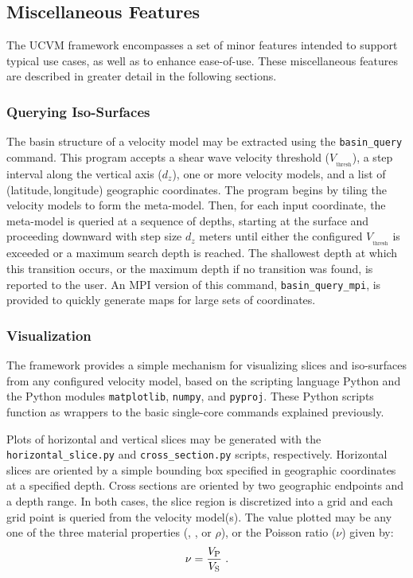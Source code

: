 
\subsection{Miscellaneous Features}

The UCVM framework encompasses a set of minor features intended to support typical use cases, as well as to enhance ease-of-use. These miscellaneous features are described in greater detail in the following sections.

\subsubsection{Querying \vs{} Iso-Surfaces}

The basin structure of a velocity model may be extracted using the \texttt{basin\_query} command. This program accepts a shear wave velocity threshold ($V_{_{\mathrm{thresh}}}$), a step interval along the vertical axis ($d_z$), one or more velocity models, and a list of (latitude,\,longitude) geographic coordinates. The program begins by tiling the velocity models to form the meta-model. Then, for each input coordinate, the meta-model is queried at a sequence of depths, starting at the surface and proceeding downward with step size $d_z$ meters until either the configured $V_{_{\mathrm{thresh}}}$ is exceeded or a maximum search depth is reached. The shallowest depth at which this transition occurs, or the maximum depth if no transition was found, is reported to the user. An MPI version of this command, \texttt{basin\_query\_mpi}, is provided to quickly generate maps for large sets of coordinates.

\subsubsection{Visualization}

The framework provides a simple mechanism for visualizing slices and iso-surfaces from any configured velocity model, based on the scripting language Python and the Python modules \texttt{matplotlib}, \texttt{numpy}, and \texttt{pyproj}. These Python scripts function as wrappers to the basic single-core commands explained previously.

Plots of horizontal and vertical slices may be generated with the \texttt{horizontal\_slice.py} and \texttt{cross\_section.py} scripts, respectively. Horizontal slices are oriented by a simple bounding box specified in geographic coordinates at a specified depth. Cross sections are oriented by two geographic endpoints and a depth range. In both cases, the slice region is discretized into a grid and each grid point is queried from the velocity model(s). The value plotted may be any one of the three material properties (\vp{}, \vs{}, or $\rho$), or the Poisson ratio ($\nu$) given by:
%
\begin{equation}
	\nu = \frac{ V_{\mathrm{P}} }{ V_{\mathrm{S}} }
	\hspace{0.3em}.
\end{equation}

